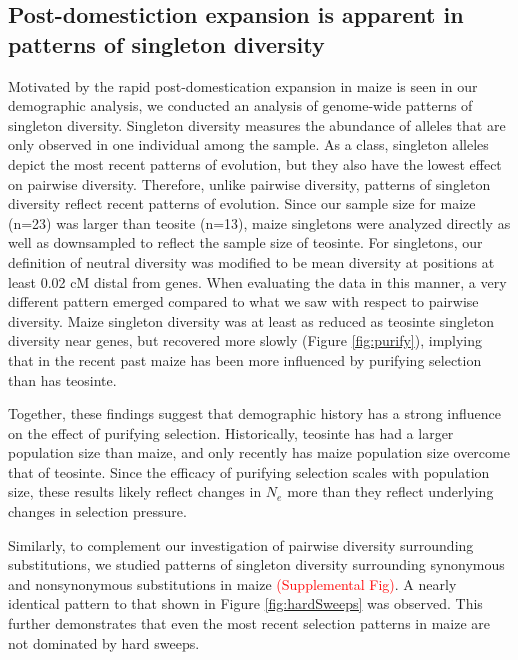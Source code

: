 \documentclass{pnastwo}
\begin{document}
\begin{article}
\section{Post-domestiction expansion is apparent in patterns of singleton diversity}
Motivated by the rapid post-domestication expansion in maize is seen in our demographic analysis, we conducted an analysis of genome-wide patterns of singleton diversity. Singleton diversity measures the abundance of alleles that are only observed in one individual among the sample. As a class, singleton alleles depict the most recent patterns of evolution, but
they also have the lowest effect on pairwise diversity. Therefore, unlike
pairwise diversity, patterns of singleton
diversity reflect recent patterns of evolution. Since our sample size
for maize (n=23) was larger than teosite (n=13), maize singletons were
analyzed directly as well as downsampled to reflect the sample size of
teosinte. For singletons, our definition of
neutral diversity was modified to be mean diversity at positions at
least 0.02 cM distal from genes. When
evaluating the data in this manner, a very different pattern
emerged compared to what we saw with respect to pairwise diversity. Maize singleton diversity was at least as reduced as teosinte singleton
diversity near genes, but recovered more slowly
(Figure \ref{fig:purify}), implying that in the
recent past maize has been more influenced by purifying selection than has
teosinte.

Together, these findings suggest that demographic history has
a strong influence on the effect of purifying selection. Historically,
teosinte has had a larger population size than maize, and only
recently has maize population size overcome that of teosinte. Since
the efficacy of purifying selection scales with population size,
these results likely reflect changes in $N_e$ more than they reflect
underlying changes in selection pressure.

Similarly, to complement our investigation of pairwise diversity surrounding substitutions, we studied patterns of singleton diversity surrounding synonymous and nonsynonymous substitutions in maize \textcolor{red}{(Supplemental Fig)}. A nearly identical pattern to that shown in Figure \ref{fig:hardSweeps} was observed. This further demonstrates that even the most recent selection patterns in maize are not dominated by hard sweeps.




\end{article}
\end{document}
